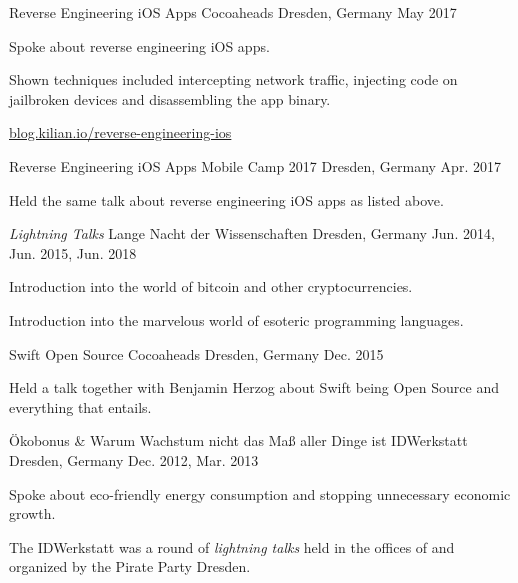 

\begin{cventries}

\cventry
	{Reverse Engineering iOS Apps}
	{Cocoaheads}
	{Dresden, Germany}
	{May 2017}
	{
		\begin{cvitems}
			\item {Spoke about reverse engineering iOS apps.}
			\item {Shown techniques included intercepting network traffic, injecting code on jailbroken devices and disassembling the app binary.}
			\item \href{http://blog.kilian.io/reverse-engineering-ios/}{blog.kilian.io/reverse-engineering-ios}
		\end{cvitems}
	}
	
\cventry
	{Reverse Engineering iOS Apps}
	{Mobile Camp 2017}
	{Dresden, Germany}
	{Apr. 2017}
	{
		\begin{cvitems}
			\item {Held the same talk about reverse engineering iOS apps as listed above.}
		\end{cvitems}
	}
	
\cventry
	{\emph{Lightning Talks}}
	{Lange Nacht der Wissenschaften}
	{Dresden, Germany}
	{Jun. 2014, Jun. 2015, Jun. 2018}
	{
		\begin{cvitems}
			\item {Introduction into the world of bitcoin and other cryptocurrencies.}
			\item {Introduction into the marvelous world of esoteric programming languages.}
		\end{cvitems}
	}

\cventry
	{Swift Open Source}
	{Cocoaheads}
	{Dresden, Germany}
	{Dec. 2015}
	{
		\begin{cvitems}
			\item {Held a talk together with Benjamin Herzog about Swift being Open Source and everything that entails.}
		\end{cvitems}
	}

\cventry
	{Ökobonus \& Warum Wachstum nicht das Maß aller Dinge ist}
	{IDWerkstatt}
	{Dresden, Germany}
	{Dec. 2012, Mar. 2013}
	{
		\begin{cvitems}
			\item {Spoke about eco-friendly energy consumption and stopping unnecessary economic growth.}
			\item {The IDWerkstatt was a round of \emph{lightning talks} held in the offices of and organized by the Pirate Party Dresden.}
		\end{cvitems}
	}

\end{cventries}
